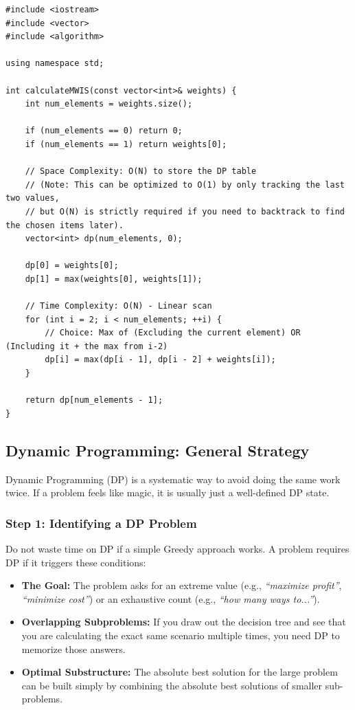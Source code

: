 \begin{lstlisting}
#include <iostream>
#include <vector>
#include <algorithm>

using namespace std;

int calculateMWIS(const vector<int>& weights) {
    int num_elements = weights.size();
    
    if (num_elements == 0) return 0;
    if (num_elements == 1) return weights[0];
    
    // Space Complexity: O(N) to store the DP table
    // (Note: This can be optimized to O(1) by only tracking the last two values, 
    // but O(N) is strictly required if you need to backtrack to find the chosen items later).
    vector<int> dp(num_elements, 0);
    
    dp[0] = weights[0];
    dp[1] = max(weights[0], weights[1]);
    
    // Time Complexity: O(N) - Linear scan
    for (int i = 2; i < num_elements; ++i) {
        // Choice: Max of (Excluding the current element) OR (Including it + the max from i-2)
        dp[i] = max(dp[i - 1], dp[i - 2] + weights[i]);
    }
    
    return dp[num_elements - 1];
}
\end{lstlisting}


\subsection{Dynamic Programming: General Strategy}

Dynamic Programming (DP) is a systematic way to avoid doing the same work twice. If a problem feels like magic, it is usually just a well-defined DP state.

\subsubsection{Step 1: Identifying a DP Problem}
Do not waste time on DP if a simple Greedy approach works. A problem requires DP if it triggers these conditions:
\begin{itemize}
    \item \textbf{The Goal:} The problem asks for an extreme value (e.g., \textit{``maximize profit''}, \textit{``minimize cost''}) or an exhaustive count (e.g., \textit{``how many ways to...''}).
    \item \textbf{Overlapping Subproblems:} If you draw out the decision tree and see that you are calculating the exact same scenario multiple times, you need DP to memorize those answers.
    \item \textbf{Optimal Substructure:} The absolute best solution for the large problem can be built simply by combining the absolute best solutions of smaller sub-problems.
\end{itemize}

